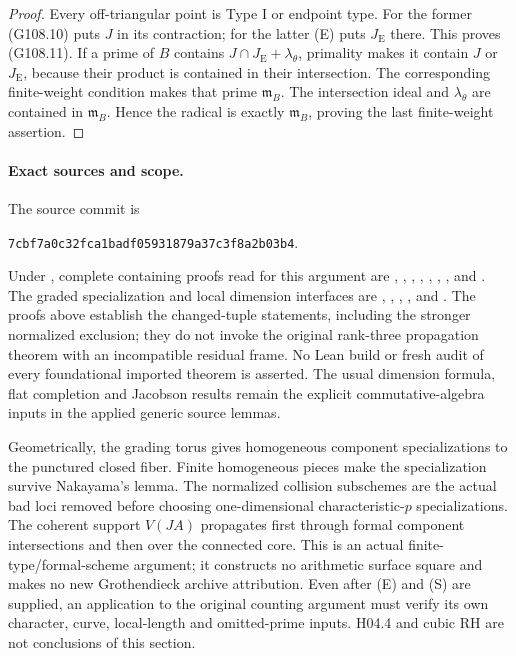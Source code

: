 \begin{proof}
Every off-triangular point is Type I or endpoint type.
For the former (G108.10) puts $J$ in its contraction; for the
latter (E) puts $J_{\mathrm E}$ there.  This proves (G108.11).
If a prime of $B$ contains $J\cap J_{\mathrm E}+\lambda_\theta$,
primality makes it contain $J$ or $J_{\mathrm E}$, because their
product is contained in their intersection.  The corresponding
finite-weight condition makes that prime $\mathfrak m_B$.
The intersection ideal and $\lambda_\theta$ are contained in
$\mathfrak m_B$.  Hence the radical is exactly $\mathfrak m_B$,
proving the last finite-weight assertion.
\end{proof}

\paragraph{Exact sources and scope.}
The source commit is
\begin{center}
\texttt{7cbf7a0c32fca1badf05931879a37c3f8a2b03b4}.
\end{center}
Under ,
complete containing proofs read for this argument are
,
,
,
,
,
,
,
and .
The graded specialization and local dimension interfaces are
,
,
,
,
 and
.
The proofs above establish the changed-tuple statements, including
the stronger normalized exclusion; they do not invoke the original
rank-three propagation theorem with an incompatible residual frame.
No Lean build or fresh audit of every foundational imported theorem
is asserted.  The usual dimension formula, flat completion and
Jacobson results remain the explicit commutative-algebra inputs
in the applied generic source lemmas.

Geometrically, the grading torus gives homogeneous component
specializations to the punctured closed fiber.  Finite homogeneous
pieces make the specialization survive Nakayama's lemma.  The
normalized collision subschemes are the actual bad loci removed
before choosing one-dimensional characteristic-$p$ specializations.
The coherent support $V(JA)$ propagates first through formal
component intersections and then over the connected core.  This is
an actual finite-type/formal-scheme argument; it constructs no
arithmetic surface square and makes no new Grothendieck archive
attribution.  Even after (E) and (S) are supplied, an application
to the original counting argument must verify its own character,
curve, local-length and omitted-prime inputs.  H04.4 and cubic RH
are not conclusions of this section.
